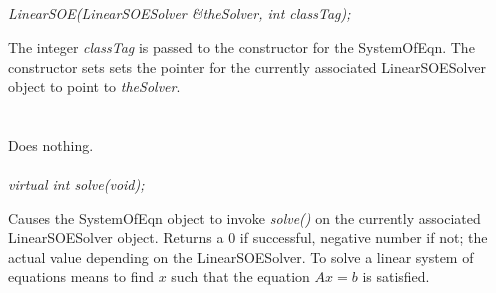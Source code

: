 \indent{} \\
\indent{} \\
\indent{} \\ 
\indent{} \\
\indent{} \\
\indent{} \\
\indent{} \\
\indent{} \\
\indent{}\\\\
\indent{}  \\ 
\indent{} \\
\indent{}\\

  \\
{\em LinearSOE(LinearSOESolver \&theSolver, int classTag);}  

The integer {\em classTag} is passed to the constructor for the
SystemOfEqn. The constructor sets sets the pointer for the currently
associated LinearSOESolver object to point to {\em theSolver}. \\

 \\
\\ 
Does nothing. \\

  \\
{\em virtual int solve(void);} 

Causes the SystemOfEqn object to invoke {\em solve()} on the currently
associated LinearSOESolver object. Returns a $0$ if successful,
negative number if not; the actual value depending on the
LinearSOESolver. To solve a linear system of equations means to find
$x$ such that the equation $Ax=b$ is satisfied. \\

